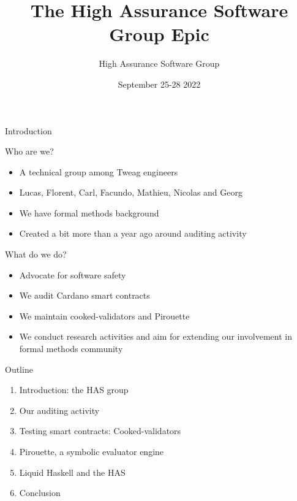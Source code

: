 \documentclass[11pt]{beamer}
\author{High Assurance Software Group}
\title{The High Assurance Software Group Epic}
\institute{Tweag.io}
\date{September 25-28 2022}
\begin{document}
\begin{frame}
\titlepage
\end{frame}

\begin{frame}{Introduction}
\begin{block}{Who are we?}
\begin{itemize}
\item A technical group among Tweag engineers
\item Lucas, Florent, Carl, Facundo, Mathieu, Nicolas and Georg
\item We have formal methods background
\item Created a bit more than a year ago around auditing activity
\end{itemize}
\end{block}
\begin{block}{What do we do?}
\begin{itemize}
\item Advocate for software safety
\item We audit Cardano smart contracts
\item We maintain cooked-validators and Pirouette
\item We conduct research activities and aim for extending our involvement in formal methods community
\end{itemize}
\end{block}
\end{frame}

\begin{frame}{Outline}
\begin{enumerate}
\item Introduction: the HAS group
\item Our auditing activity
\item Testing smart contracts: Cooked-validators
\item Pirouette, a symbolic evaluator engine
\item Liquid Haskell and the HAS
\item Conclusion
\end{enumerate}
\end{frame}
\end{document}
